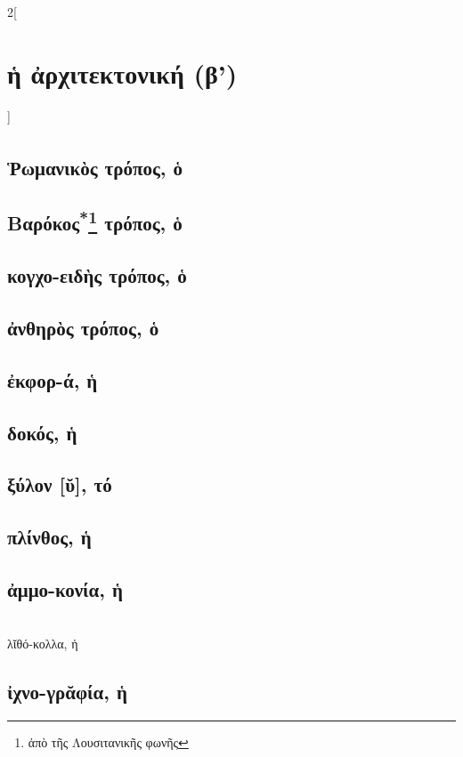 \documentclass{book}
\begin{document}
\begin{multicols}{2}[\section{ἡ ἀρχιτεκτονική (β')}]
\subsection{Ῥωμανικὸς\textsuperscript{\textdagger} τρόπος, ὁ}
\subsection{Βαρόκος\textsuperscript{*}\protect\footnote{ἀπὸ τῆς Λουσιτανικῆς φωνῆς} τρόπος, ὁ}
\subsection{κογχο-ειδὴς τρόπος, ὁ}
\subsection{ἀνθηρὸς τρόπος, ὁ}
\subsection{ἐκφορ-ά, ἡ}         
\subsection{δοκός, ἡ}
\subsection{ξύλον [ῠ], τό}
\subsection{πλίνθος, ἡ}
\subsection{ἀμμο-κονία, ἡ}
 ~\\
λῐθό-κολλα, ἡ
\subsection{ἰχνο-γρᾰφία, ἡ}

\end{multicols}
\end{document}
